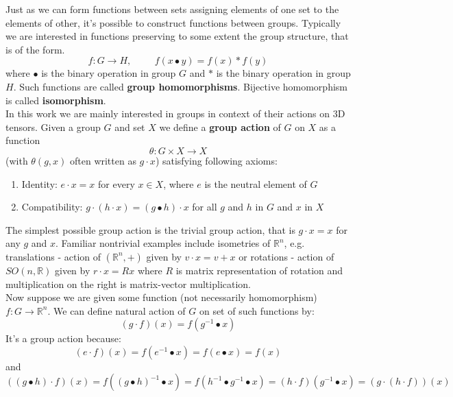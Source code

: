         Just as we can form functions between sets assigning elements of one set to
        the elements of other, it's possible to construct functions between groups.
        Typically we are interested in functions preserving to some extent the group structure,
        that is of the form.
        \begin{equation}
            f:G \to H, \hspace{1cm} f(x\bullet y) = f(x) \ast f(y)
        \end{equation}
        where $\bullet$ is the binary operation in group $G$ and $\ast$ is the binary operation
        in group $H$. Such functions are called \textbf{group homomorphisms}.
        Bijective homomorphism is called \textbf{isomorphism}.\\

        In this work we are mainly interested in groups in context of their actions
        on 3D tensors. Given a group $G$ and set $X$ we define a
        \textbf{group action} of $G$ on $X$ as a function
        \begin{equation}
            \theta: G \times X \to X
        \end{equation}
        (with $\theta(g,x)$ often written as $g\cdot x$) satisfying following axioms:
        \begin{enumerate}
            \item Identity: $e \cdot x = x$ for every $x \in X$, where $e$ is the neutral element
                    of $G$
            \item Compatibility: $g \cdot \left(h \cdot x\right) =
                \left(g \bullet h \right) \cdot x$ for all $g$ and $h$ in $G$ and $x$ in $X$
        \end{enumerate}
        The simplest possible group action is the trivial group action, that is
        $g\cdot x = x$ for any $g$ and $x$. Familiar nontrivial examples include isometries
        of $\mathbb{R}^n$, e.g.
        translations - action of $\left(\mathbb{R}^n,+\right)$ given by $v \cdot x = v+x$ or
        rotations - action of $SO(n,\mathbb{R})$ given by $r \cdot x = Rx$ where
        $R$ is matrix representation of rotation and
        multiplication on the right is matrix-vector multiplication.\\
        Now suppose we are given some function (not necessarily homomorphism)
        $f:G\to \mathbb{R}^n$.
        We can define natural action of $G$ on set of such functions by:
        \begin{equation}
            (g\cdot f)(x) = f(g^{-1}\bullet x)
            \label{eq:action_on_function}
        \end{equation}
        It's a group action because:
        $$(e\cdot f)(x) = f(e^{-1}\bullet x) = f(e \bullet x) = f(x)$$
        and
        $$ ((g\bullet h) \cdot f)(x) = f((g\bullet h)^{-1} \bullet x) =
            f(h^{-1}\bullet g^{-1} \bullet x) = (h\cdot f)(g^{-1} \bullet x) =
            (g\cdot(h \cdot f))(x)$$








